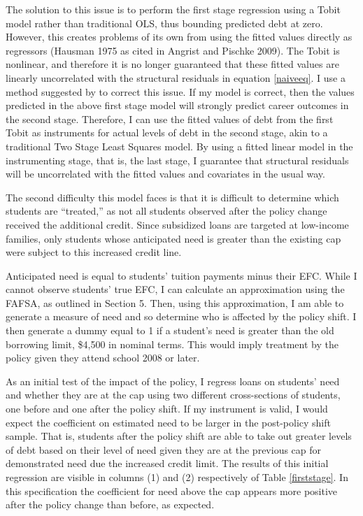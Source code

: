 \documentclass[12pt]{article}
\begin{document}
	The solution to this issue is to perform the first stage regression using a Tobit model rather than traditional OLS, thus bounding predicted debt at zero. However, this creates problems of its own from using the fitted values directly as regressors (Hausman 1975 as cited in Angrist and Pischke 2009).	 The Tobit is nonlinear, and therefore it is no longer guaranteed that these fitted values are linearly uncorrelated with the structural residuals in equation \ref{naiveeq}. I use a method suggested by \textcite{angrist2009} to correct this issue. If my model is correct, then the values predicted in the above first stage model will strongly predict career outcomes in the second stage. Therefore, I can use the fitted values of debt from the first Tobit as instruments for actual levels of debt in the second stage, akin to a traditional Two Stage Least Squares model. By using a fitted linear model in the instrumenting stage, that is, the last stage, I guarantee that structural residuals will be uncorrelated with the fitted values and covariates in the usual way. 
	
	The second difficulty this model faces is that it is difficult to determine which students are ``treated,'' as not all students observed after the policy change received the additional credit. Since subsidized loans are targeted at low-income families, only students whose anticipated need is greater than the existing cap were subject to this increased credit line. 
	
	Anticipated need is equal to students' tuition payments minus their EFC. While I cannot observe students' true EFC, I can calculate an approximation using the FAFSA, as outlined in Section 5. Then, using this approximation, I am able to generate a measure of need and so determine who is affected by the policy shift. I then generate a dummy equal to 1 if a student's need is greater than the old borrowing limit, \$4,500 in nominal terms. This would imply treatment by the policy given they attend school 2008 or later.
	
	As an initial test of the impact of the policy, I regress loans on students' need and whether they are at the cap using two different cross-sections of students, one before and one after the policy shift. If my instrument is valid, I would expect the coefficient on estimated need to be larger in the post-policy shift sample. That is, students after the policy shift are able to take out greater levels of debt based on their level of need given they are at the previous cap for demonstrated need due the increased credit limit. The results of this initial regression are visible in columns (1) and (2) respectively of Table \ref{firststage}. In this specification the coefficient for need above the cap appears more positive after the policy change than before, as expected. 
	
\end{document}
